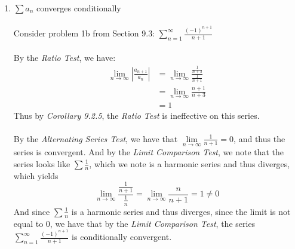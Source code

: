\documentclass[12pt,letterpaper]{article}
\newcommand{\limx}[2]{\displaystyle\lim\limits_{#1 \to #2}}
\newcommand{\abs}[1]{\left\lvert #1 \right\rvert}
\theoremstyle{case}
\theoremstyle{definition}
\begin{document}
\begin{enumerate}
\begin{enumerate}
			\item $\sum a_n$ converges conditionally
			\\\\Consider problem 1b from Section 9.3: $\displaystyle\sum_{n=1}^{\infty} \frac{(-1)^{n+1}}{n+1}$
			\\\\By the \textit{Ratio Test}, we have:
			\begin{align*}
			\limx{n}{\infty} \abs{\frac{a_{n+1}}{a_n}} &= \limx{n}{\infty} \frac{\displaystyle\frac{1}{n+3}}{\displaystyle\frac{1}{n+1}} \\
			&= \limx{n}{\infty} \frac{n+1}{n+3} \\
			&= 1
			\end{align*}
			Thus by \textit{Corollary 9.2.5}, the \textit{Ratio Test} is ineffective on this series.
			\\\\By the \textit{Alternating Series Test}, we have that $\limx{n}{\infty} \frac{1}{n+1} = 0$, and thus the series is convergent. And by the \textit{Limit Comparison Test}, we note that the series looks like $\sum \frac{1}{n}$, which we note is a harmonic series and thus diverges, which yields
			\[\limx{n}{\infty} \frac{\displaystyle\frac{1}{n+1}}{\frac{1}{n}} = \limx{n}{\infty} \frac{n}{n+1} = 1 \neq 0\]
			And since $\sum \frac{1}{n}$ is a harmonic series and thus diverges, since the limit is not equal to 0, we have that by the \textit{Limit Comparison Test}, the series $\displaystyle\sum_{n=1}^{\infty} \frac{(-1)^{n+1}}{n+1}$ is conditionally convergent.\\
			

\end{enumerate}
\end{enumerate}
\end{document}
